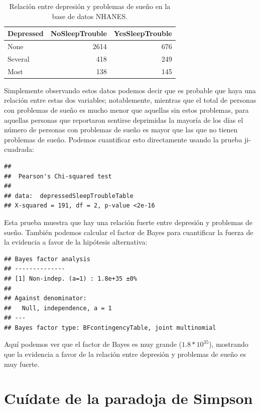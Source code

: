 \documentclass[
  12pt,
]{book}
\begin{document}
\begin{table}

\caption{\label{tab:unnamed-chunk-70}Relación entre depresión y problemas de sueño en la base de datos NHANES.}
\centering
\begin{tabular}[t]{l|r|r}
\hline
Depressed & NoSleepTrouble & YesSleepTrouble\\
\hline
None & 2614 & 676\\
\hline
Several & 418 & 249\\
\hline
Most & 138 & 145\\
\hline
\end{tabular}
\end{table}

Simplemente observando estos datos podemos decir que es probable que haya una relación entre estas dos variables; notablemente, mientras que el total de personas con problemas de sueño es mucho menor que aquellas sin estos problemas, para aquellas personas que reportaron sentirse deprimidas la mayoría de los días el número de personas con problemas de sueño es mayor que las que no tienen problemas de sueño. Podemos cuantificar esto directamente usando la prueba ji-cuadrada:

\begin{verbatim}
## 
##  Pearson's Chi-squared test
## 
## data:  depressedSleepTroubleTable
## X-squared = 191, df = 2, p-value <2e-16
\end{verbatim}

Esta prueba muestra que hay una relación fuerte entre depresión y problemas de sueño. También podemos calcular el factor de Bayes para cuantificar la fuerza de la evidencia a favor de la hipótesis alternativa:

\begin{verbatim}
## Bayes factor analysis
## --------------
## [1] Non-indep. (a=1) : 1.8e+35 ±0%
## 
## Against denominator:
##   Null, independence, a = 1 
## ---
## Bayes factor type: BFcontingencyTable, joint multinomial
\end{verbatim}

Aquí podemos ver que el factor de Bayes es muy grande (\(1.8 * 10^{35}\)), mostrando que la evidencia a favor de la relación entre depresión y problemas de sueño es muy fuerte.

\hypertarget{cuuxeddate-de-la-paradoja-de-simpson}{%
\section{Cuídate de la paradoja de Simpson}\label{cuuxeddate-de-la-paradoja-de-simpson}}
\end{document}
